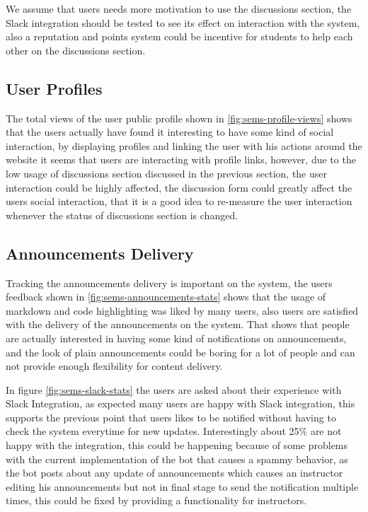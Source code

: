\newParagraph
We assume that users needs more motivation to use the discussions section, the Slack\texttrademark{} integration should be tested to see its
effect on interaction with the system, also a reputation and points system could be incentive for students to help each other on the discussions
section.

\subsection{User Profiles}
\label{sub:user-profiles-stats}
The total views of the user public profile shown in \ref{fig:sems-profile-views} shows that the users actually have found it interesting to have
some kind of social interaction, by displaying profiles and linking the user with his actions around the website it seems that users are
interacting with profile links, however, due to the low usage of discussions section discussed in the previous section, the user interaction
could be highly affected, the discussion form could greatly affect the users social interaction, that it is a good idea to re-measure the user
interaction whenever the status of discussions section is changed.

\subsection{Announcements Delivery}
\label{sub:announcements-delivery-stats}
Tracking the announcements delivery is important on the system, the users feedback shown in \ref{fig:sems-announcements-stats} shows that the usage
of markdown and code highlighting was liked by many users, also users are satisfied with the delivery of the announcements on the system. That shows
that people are actually interested in having some kind of notifications on announcements, and the look of plain announcements could be boring for
a lot of people and can not provide enough flexibility for content delivery.


\newParagraph
In figure \ref{fig:sems-slack-stats} the users are asked about their experience with Slack\texttrademark{} Integration, as expected
many users are happy with Slack\texttrademark{} integration, this supports the previous point that users likes to be notified
without having to check the system everytime for new updates. Interestingly about 25\% are not happy with the integration, this could
be happening because of some problems with the current implementation of the bot that causes a spammy behavior, as the bot posts
about any update of announcements which causes an instructor editing his announcements but not in final stage to send the notification
multiple times, this could be fixed by providing a  functionality for instructors.


